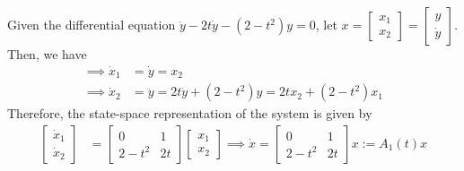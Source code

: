 Given the differential equation \( \ddot y - 2t\dot y - (2 - t^2)y = 0 \),
let \( x = \begin{bmatrix} x_1 \\ x_2 \end{bmatrix} = \begin{bmatrix} y \\ \dot y \end{bmatrix} \).
Then, we have
\begin{align*}
    \implies
    \dot x_1
     & =
    \dot y = x_2
    \\
    \implies
    \dot x_2
     & =
    \ddot y = 2t\dot y + (2 - t^2)y = 2tx_2 + (2 - t^2)x_1
\end{align*}
Therefore, the state-space representation of the system is given by
\begin{align*}
    \begin{bmatrix}
        \dot x_1 \\
        \dot x_2
    \end{bmatrix}
     & =
    \begin{bmatrix}
        0       & 1  \\
        2 - t^2 & 2t
    \end{bmatrix}
    \begin{bmatrix}
        x_1 \\
        x_2
    \end{bmatrix}
    \implies
    \dot x
    =
    \begin{bmatrix}
        0       & 1  \\
        2 - t^2 & 2t
    \end{bmatrix}
    x
    :=
    A_1(t) x
\end{align*}

